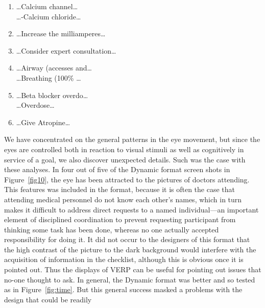 \documentclass{sigchi}
\begin{document}
\begin{enumerate}
	\item \ldots Calcium channel\ldots  \\
		\ldots -Calcium chloride\ldots  \\ 
	  
	\item \ldots Increase the milliamperes\ldots \\

	\item \ldots Consider expert consultation\ldots  
	\item  \ldots Airway (accesses and\ldots  \\
		\ldots Breathing (100\% \ldots \\
	\item	\ldots Beta blocker overdo\ldots  \\
		\ldots Overdose\ldots 
	\item  \ldots Give Atropine\ldots 

\end{enumerate}

We have concentrated on the general patterns in the eye movement,
but since the eyes are controlled both in reaction to visual
stimuli as well as cognitively in service of a goal, we also
discover unexpected details. Such was the case with these
analyses. In four out of five of the Dynamic format screen shots
in Figure~\ref{fig10}, the eye has been attracted to the pictures of doctors
attending. This features was included in the format, because it
is often the case that attending medical personnel do not know
each other’s names, which in turn makes it difficult to address
direct requests to a named individual—an important element of
disciplined coordination to prevent requesting participant from
thinking some task has been done, whereas no one actually
accepted responsibility for doing it. It did not occur to the
designers of this format that the high contrast of the picture to
the dark background would interfere with the acquisition of
information in the checklist, although this is obvious once it is
pointed out. Thus the displays of VERP can be useful for pointing
out issues that no-one thought to ask. In general, the Dynamic
format was better and so tested as in Figure~\ref{fig:time}. But 
this general success masked a problems with the design that could 
be readily
\end{document}
